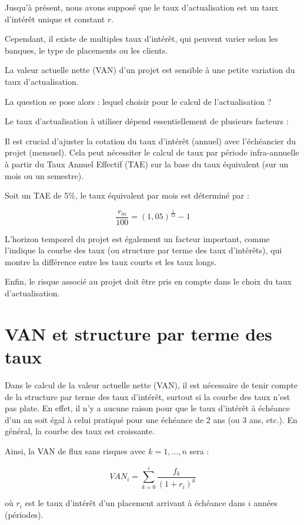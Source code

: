 \documentclass[a4paper, 12pt]{report}
\begin{document}
Jusqu'à présent, nous avons supposé que le taux d'actualisation est un taux d'intérêt unique et constant \( r \).

Cependant, il existe de multiples taux d'intérêt, qui peuvent varier selon les banques, le type de placements ou les clients.


La valeur actuelle nette (VAN) d'un projet est sensible à une petite variation du taux d'actualisation.


La question se pose alors : lequel choisir pour le calcul de l’actualisation ?

Le taux d'actualisation à utiliser dépend essentiellement de plusieurs facteurs :

Il est crucial d'ajuster la cotation du taux d'intérêt (annuel) avec l'échéancier du projet (mensuel). Cela peut nécessiter le calcul de taux par période infra-annuelle à partir du Taux Annuel Effectif (TAE) sur la base du taux équivalent (sur un mois ou un semestre).

Soit un TAE de 5\%, le taux équivalent par mois est déterminé par :

\[
\frac{r_m}{100} = (1,05)^{\frac{1}{12}} - 1
\]

L'horizon temporel du projet est également un facteur important, comme l'indique la courbe des taux (ou structure par terme des taux d'intérêts), qui montre la différence entre les taux courts et les taux longs.

Enfin, le risque associé au projet doit être pris en compte dans le choix du taux d'actualisation.

\section{VAN  et structure par terme des taux}

Dans le calcul de la valeur actuelle nette (VAN), il est nécessaire de tenir compte de la structure par terme des taux d'intérêt, surtout si la courbe des taux n'est pas plate. En effet, il n’y a aucune raison pour que le taux d’intérêt à échéance d’un an soit égal à celui pratiqué pour une échéance de 2 ans (ou 3 ans, etc.). En général, la courbe des taux est croissante.

Ainsi, la VAN de flux sans risques avec \( k = 1, \ldots, n \) sera :

\[
VAN_i = \sum_{k=0}^{i} \frac{f_k}{(1 + r_i)^k}
\]

où \( r_i \) est le taux d’intérêt d’un placement arrivant à échéance dans \( i \) années (périodes).
\end{document}
